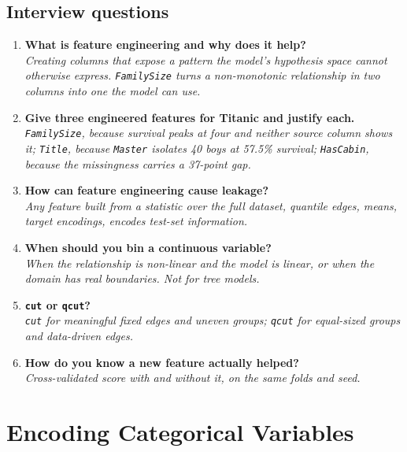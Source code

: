 \documentclass[11pt,a4paper]{article}
\begin{document}
\subsection*{Interview questions}

\begin{enumerate}\itemsep4pt
  \item \textbf{What is feature engineering and why does it help?}\\
        \emph{Creating columns that expose a pattern the model's hypothesis space cannot
        otherwise express. \texttt{FamilySize} turns a non-monotonic relationship in two
        columns into one the model can use.}
  \item \textbf{Give three engineered features for Titanic and justify each.}\\
        \emph{\texttt{FamilySize}, because survival peaks at four and neither source column
        shows it; \texttt{Title}, because \texttt{Master} isolates 40 boys at 57.5\%
        survival; \texttt{HasCabin}, because the missingness carries a 37-point gap.}
  \item \textbf{How can feature engineering cause leakage?}\\
        \emph{Any feature built from a statistic over the full dataset, quantile edges,
        means, target encodings, encodes test-set information.}
  \item \textbf{When should you bin a continuous variable?}\\
        \emph{When the relationship is non-linear and the model is linear, or when the
        domain has real boundaries. Not for tree models.}
  \item \textbf{\lstinline|cut| or \lstinline|qcut|?}\\
        \emph{\lstinline|cut| for meaningful fixed edges and uneven groups;
        \lstinline|qcut| for equal-sized groups and data-driven edges.}
  \item \textbf{How do you know a new feature actually helped?}\\
        \emph{Cross-validated score with and without it, on the same folds and seed.}
\end{enumerate}

\newpage
\section{Encoding Categorical Variables}

\end{document}
